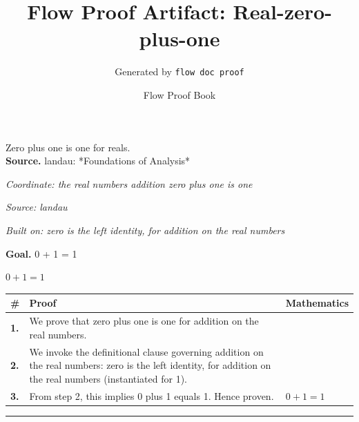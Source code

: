\documentclass[11pt]{article}
\title{Flow Proof Artifact: Real-zero-plus-one}
\author{Generated by \texttt{flow doc proof}}
\date{Flow Proof Book}
\theoremstyle{definition}
\begin{document}
\maketitle
Zero plus one is one for reals.\\[0.5em]
\textbf{Source.} landau: *Foundations of Analysis*\\[0.5em]
\bigskip
{}\par
\smallskip\noindent\textit{Coordinate: the real numbers \cdot addition \cdot zero plus one is one}\par
\smallskip\noindent\textit{Source: landau}\par
\smallskip\noindent\textit{Built on: zero is the left identity, for addition on the real numbers}\par
\medskip
\noindent\textbf{Goal.} 0 + 1 = 1\par
\noindent$\displaystyle 0 + 1 = 1$\par
\medskip
\noindent
\begin{tabular}{@{} >{\raggedright\arraybackslash}p{} >{\raggedright\arraybackslash}p{} >{\raggedleft\arraybackslash}p{} @{}}
\textbf{\#} & \textbf{Proof} & \textbf{Mathematics} \\
\midrule
\textbf{1.} & We prove that zero plus one is one for addition on the real numbers. & \\[0.45em]
\textbf{2.} & We invoke the definitional clause governing addition on the real numbers: zero is the left identity, for addition on the real numbers (instantiated for 1). & \\[0.45em]
\textbf{3.} & From step 2, this implies 0 plus 1 equals 1. Hence proven. & $\displaystyle 0 + 1 = 1$ \\[0.45em]
\bottomrule
\end{tabular}
\label{thm:Real-addition-zero_plus_one_is_one}
\par\medskip\hrule
\end{document}

